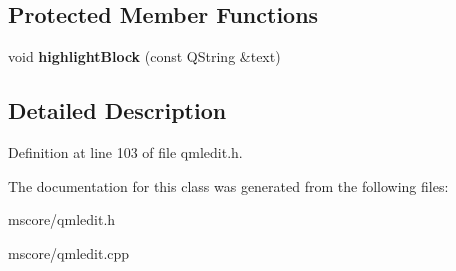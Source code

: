 \subsection*{Protected Member Functions}
\begin{DoxyCompactItemize}
\item 
\mbox{\label{class_ms_1_1_j_s_highlighter_a38d7bb298cfc68aaae62fdd555169022}} 
void {\bfseries highlight\+Block} (const Q\+String \&text)
\end{DoxyCompactItemize}


\subsection{Detailed Description}


Definition at line 103 of file qmledit.\+h.



The documentation for this class was generated from the following files\+:\begin{DoxyCompactItemize}
\item 
mscore/qmledit.\+h\item 
mscore/qmledit.\+cpp\end{DoxyCompactItemize}
